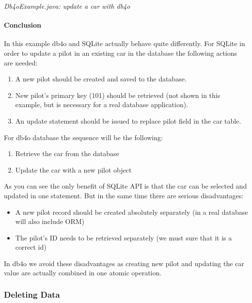 {\small\itshape Db4oExample.java: update a car with db4o\par}
\medskip

\paragraph*{Conclusion}

In this example db4o and SQLite actually behave quite differently. For SQLite in order to update a pilot in an existing car in the database the following actions are needed:

\begin{enumerate}
\item A new pilot should be created and saved to the database.
\item New pilot's primary key (101) should be retrieved (not shown in this example, but is necessary for a real database application).
\item An update statement should be issued to replace pilot field in the car table.
\end{enumerate}

For db4o database the sequence will be the following:

\begin{enumerate}
\item Retrieve the car from the database
\item Update the car with a new pilot object
\end{enumerate}

As you can see the only benefit of SQLite API is that the car can be selected and updated in one statement. But in the same time there are serious disadvantages:

\begin{itemize}
\item A new pilot record should be created absolutely separately (in a real database will also include ORM)
\item The pilot's ID needs to be retrieved separately (we must sure that it is a correct id)
\end{itemize}

In db4o we avoid these disadvantages as creating new pilot and updating the car value are actually combined in one atomic operation.

\subsubsection{Deleting Data}
\label{ref:platform-specific-issues-android-deleting-data}


